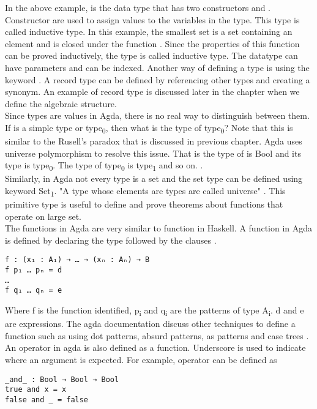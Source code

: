 In the above example,  is the data type that has two constructors  and
. Constructor are used to assign values to the variables in the type. This
type is called inductive type. In this example, the smallest set is a set
containing an element  and is closed under the function . Since the
properties of this function can be proved inductively, the type is called
inductive type\cite{enwiki:1127496533}. The datatype can have parameters
and	can be indexed.  
Another way of defining a type is using the keyword . A record type can be
defined by referencing other types and creating a synonym. An example of record
type is discussed later in the chapter when we define the algebraic structure.\\
Since types are values in Agda, there is no real way to distinguish between
them. If  is a simple type or type\textsubscript{0}, then what is the type
of type\textsubscript{0}? Note that this is similar to the Rusell's paradox that
is discussed in previous chapter. Agda uses universe polymorphism to resolve
this issue. That is the type of  is Bool and its type is
type\textsubscript{0}. The type of  type\textsubscript{0} is
type\textsubscript{1} and so on. \cite{kidney2020finiteness}.\\
Similarly, in Agda not every type is a set and the set type can be defined using
keyword Set\textsubscript{1}. "A type whose elements are types are called
universe" \cite{universeagda}. This primitive type is useful to define and prove
theorems about functions that operate on large set.\\

The functions in Agda are very similar to function in Haskell. A function in Agda
is defined by declaring the type followed by the clauses \cite{agdaFunction}. 
\begin{verbatim}
f : (x₁ : A₁) → … → (xₙ : Aₙ) → B
f p₁ … pₙ = d
…
f q₁ … qₙ = e
\end{verbatim} 
Where f is the function identified, p\textsubscript{i} and q\textsubscript{i}
are the patterns of type A\textsubscript{i}. d and e are expressions. The agda
documentation discuss other techniques to define a function such as using dot
patterns, absurd patterns, as patterns and case trees \cite{agdaFunction}.\\

An operator in agda is also defined as a function. Underscore is used to
indicate where an argument is expected. For example,  operator can be defined as 
\begin{verbatim}
_and_ : Bool → Bool → Bool
true and x = x
false and _ = false
\end{verbatim}

